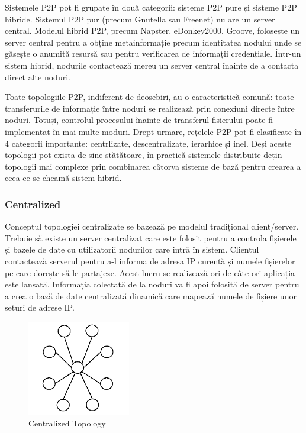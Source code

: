 Sistemele P2P pot fi grupate în două categorii: sisteme P2P pure și sisteme
P2P hibride. Sistemul P2P pur (precum Gnutella sau Freenet) nu are un server
central. Modelul hibrid P2P, precum Napster, eDonkey2000, Groove, folosește un
server central pentru a obține metainformație precum identitatea nodului unde
se găsește o anumită resursă sau pentru verificarea de informații credențiale.
Într-un sistem hibrid, nodurile contactează mereu un server central înainte de
a contacta direct alte noduri.

Toate topologiile P2P, indiferent de deosebiri, au o caracteristică comună:
toate transferurile de informație între noduri se realizează prin conexiuni
directe între noduri. Totuși, controlul procesului înainte de transferul
fișierului poate fi implementat în mai multe moduri. Drept urmare, rețelele
P2P pot fi clasificate în 4 categorii importante: centrlizate,
descentralizate, ierarhice și inel. Deși aceste topologii pot exista de sine
stătătoare, în practică sistemele distribuite dețin topologii mai complexe
prin combinarea câtorva sisteme de bază pentru crearea a ceea ce se cheamă
sistem hibrid.

\subsubsection{Centralized}

Conceptul topologiei centralizate se bazează pe modelul tradițional
client/server. Trebuie să existe un server centralizat care este folosit
pentru a controla fișierele și bazele de date cu utilizatorii nodurilor care
intră în sistem. Clientul contactează serverul pentru a-l informa de adresa IP
curentă și numele fișierelor pe care dorește să le partajeze. Acest lucru se
realizează ori de câte ori aplicația este lansată. Informația colectată de la
noduri va fi apoi folosită de server pentru a crea o bază de date centralizată
dinamică care mapează numele de fișiere unor seturi de adrese IP.

\begin{figure}
  \centering
  \includegraphics[width=0.4\textwidth]{src/img/p2p-systems/centralized}
  \caption{Centralized Topology}
  \label{fig:p2p-systems:centralized}
\end{figure}

